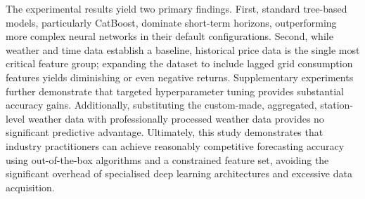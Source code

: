 The experimental results yield two primary findings. First, standard tree-based 
models, particularly CatBoost, dominate short-term horizons, outperforming more 
complex neural networks in their default configurations. Second, while weather
and time data establish a baseline, historical price data is the single most 
critical feature group; expanding the dataset to include lagged grid 
consumption features yields diminishing or even negative returns. Supplementary 
experiments further demonstrate that targeted hyperparameter tuning provides 
substantial accuracy gains. Additionally, substituting the custom-made, 
aggregated, station-level weather data with professionally processed weather 
data provides no significant predictive advantage. Ultimately, this study 
demonstrates that industry practitioners can 
achieve reasonably competitive 
forecasting accuracy using out-of-the-box algorithms and a constrained feature 
set, avoiding the significant overhead of 
specialised deep learning 
architectures and excessive data acquisition.\\
